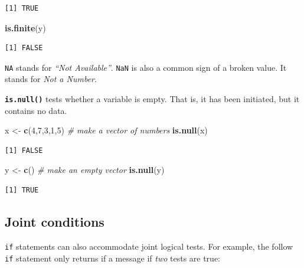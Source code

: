 \documentclass[
]{book}
\newenvironment{Shaded}{\begin{snugshade}}{\end{snugshade}}
\newcommand{\CommentTok}[1]{\textcolor[rgb]{0.56,0.35,0.01}{\textit{#1}}}
\newcommand{\DecValTok}[1]{\textcolor[rgb]{0.00,0.00,0.81}{#1}}
\newcommand{\KeywordTok}[1]{\textcolor[rgb]{0.13,0.29,0.53}{\textbf{#1}}}
\newcommand{\NormalTok}[1]{#1}
\newcommand{\StringTok}[1]{\textcolor[rgb]{0.31,0.60,0.02}{#1}}
\begin{document}
\begin{verbatim}
[1] TRUE
\end{verbatim}

\begin{Shaded}
\begin{Highlighting}[]
\KeywordTok{is.finite}\NormalTok{(y)}
\end{Highlighting}
\end{Shaded}

\begin{verbatim}
[1] FALSE
\end{verbatim}

\texttt{NA} stands for \emph{``Not Available''}. \texttt{NaN} is also a common sign of a broken value. It stands for \emph{Not a Number}.

\textbf{\texttt{is.null()}} tests whether a variable is empty. That is, it has been initiated, but it contains no data.

\begin{Shaded}
\begin{Highlighting}[]
\NormalTok{x <-}\StringTok{ }\KeywordTok{c}\NormalTok{(}\DecValTok{4}\NormalTok{,}\DecValTok{7}\NormalTok{,}\DecValTok{3}\NormalTok{,}\DecValTok{1}\NormalTok{,}\DecValTok{5}\NormalTok{) }\CommentTok{# make a vector of numbers}
\KeywordTok{is.null}\NormalTok{(x)}
\end{Highlighting}
\end{Shaded}

\begin{verbatim}
[1] FALSE
\end{verbatim}

\begin{Shaded}
\begin{Highlighting}[]
\NormalTok{y <-}\StringTok{ }\KeywordTok{c}\NormalTok{() }\CommentTok{# make an empty vector}
\KeywordTok{is.null}\NormalTok{(y)}
\end{Highlighting}
\end{Shaded}

\begin{verbatim}
[1] TRUE
\end{verbatim}

\hypertarget{joint-conditions}{%
\subsection*{Joint conditions}\label{joint-conditions}}

\texttt{if} statements can also accommodate joint logical tests. For example, the follow \texttt{if} statement only returns if a message if \emph{two} tests are true:
\end{document}
